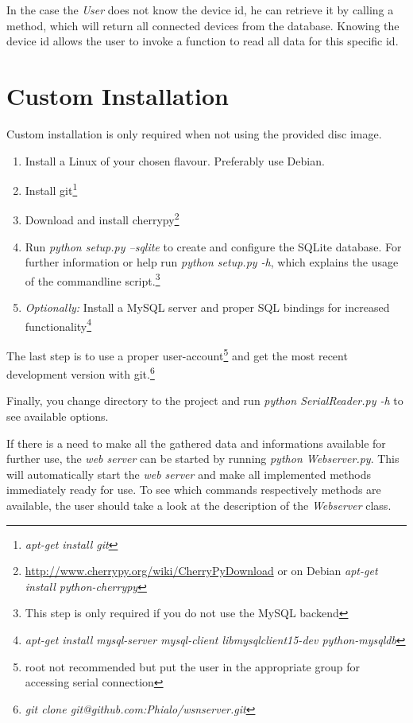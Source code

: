 In the case the \textit{User} does not know the device id, he can retrieve it by calling a method, which will return all connected devices from the database. Knowing the device id allows the user to invoke a function to read all data for this specific id.

\newpage
\section{Custom Installation}
\label{sec:install}

Custom installation is only required when not using the provided disc image.

\begin{enumerate}
    \item Install a Linux of your chosen flavour. Preferably use Debian.
    \item Install git\footnote{\textit{apt-get install git}}
    \item Download and install cherrypy\footnote{\url{http://www.cherrypy.org/wiki/CherryPyDownload} or on Debian \textit{apt-get install python-cherrypy}}
    \item Run \textit{python setup.py --sqlite} to create and configure the SQLite database. For further information or help run \textit{python setup.py -h}, which explains the usage of the commandline script.\footnote{This step is only required if you do not use the MySQL backend}
    \item \textit{Optionally:} Install a MySQL server and proper SQL bindings for increased functionality\footnote{\textit{apt-get install mysql-server mysql-client libmysqlclient15-dev python-mysqldb}}
\end{enumerate}

The last step is to use a proper user-account\footnote{root not recommended but put the user in the appropriate group for accessing serial connection} and
get the most recent development version with git.\footnote{\textit{git clone git@github.com:Phialo/wsnserver.git}}

Finally, you change directory to the project and run \textit{python SerialReader.py -h} to see available options.

If there is a need to make all the gathered data and informations available for further use, the \textit{web server} can be started by running \textit{python Webserver.py}. This will automatically start the 
\textit{web server} and make all implemented methods immediately ready for use. To see which commands respectively methods are available, the user should take a look at the description of the \textit{Webserver} class.
